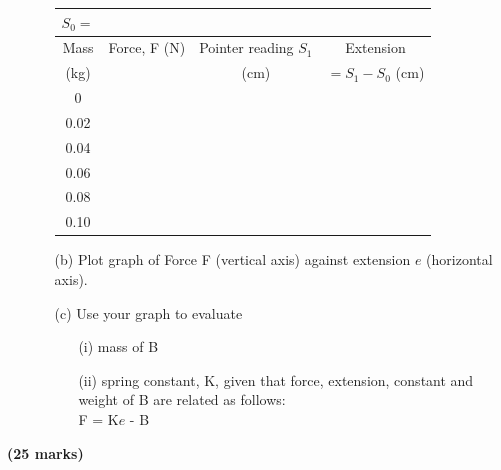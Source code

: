 \begin{enumerate}
\begin{itemize}
\begin{tabular}{|p{2cm}|p{3cm}|p{3cm}|p{3cm}|}\cline{1-1}
\multicolumn{1}{|p{2cm}|}{$S_0 = $}&\multicolumn{2}{c}{} & \multicolumn{1}{p{2.5cm}}{} \\ \hline
\multicolumn{1}{|c|}{Mass} & \multicolumn{1}{c|}{Force, F (N)} & \multicolumn{1}{c|}{Pointer reading $S_1$} & \multicolumn{1}{c|}{Extension}\\
\multicolumn{1}{|c|}{(kg)} & \multicolumn{1}{c|}{} & \multicolumn{1}{c|}{(cm)} & \multicolumn{1}{c|}{$= S_1 - S_0$ (cm)}\\ \hline
\multicolumn{1}{|c|}{0} & \multicolumn{1}{c|}{} & \multicolumn{1}{c|}{} & \multicolumn{1}{c|}{}\\ 
\multicolumn{1}{|c|}{0.02} & \multicolumn{1}{c|}{} & \multicolumn{1}{c|}{} & \multicolumn{1}{c|}{}\\ 
\multicolumn{1}{|c|}{0.04} & \multicolumn{1}{c|}{} & \multicolumn{1}{c|}{} & \multicolumn{1}{c|}{}\\ 
\multicolumn{1}{|c|}{0.06} & \multicolumn{1}{c|}{} & \multicolumn{1}{c|}{} & \multicolumn{1}{c|}{}\\ 
\multicolumn{1}{|c|}{0.08} & \multicolumn{1}{c|}{} & \multicolumn{1}{c|}{} & \multicolumn{1}{c|}{}\\ 
\multicolumn{1}{|c|}{0.10} & \multicolumn{1}{c|}{} & \multicolumn{1}{c|}{} & \multicolumn{1}{c|}{}\\ \hline
\end{tabular}
\item[(b)] Plot graph of Force F (vertical axis) against extension $e$ (horizontal axis).
\item[(c)] Use your graph to evaluate
\begin{itemize}
\item[(i)] mass of B
\item[(ii)] spring constant, K, given that force, extension, constant and weight of B are related as follows:\\
F = K$e$ - B
\end{itemize}
\end{itemize}

\end{enumerate}
\flushright \textbf{(25 marks)}




